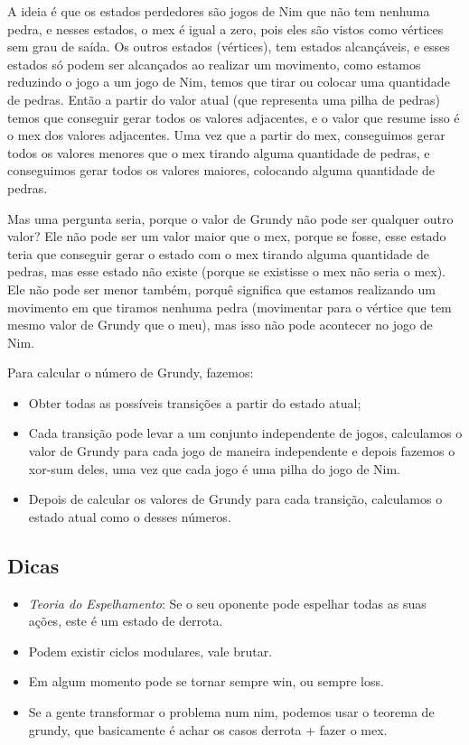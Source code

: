         A ideia é que os estados perdedores são jogos de Nim que não tem nenhuma pedra, e nesses estados, o mex é igual a zero, pois eles são vistos como vértices sem grau de saída. Os outros estados (vértices), tem estados alcançáveis, e esses estados só podem ser alcançados ao realizar um movimento, como estamos reduzindo o jogo a um jogo de Nim, temos que tirar ou colocar uma quantidade de pedras. Então a partir do valor atual (que representa uma pilha de pedras) temos que conseguir gerar todos os valores adjacentes, e o valor que resume isso é o mex dos valores adjacentes. Uma vez que a partir do mex, conseguimos gerar todos os valores menores que o mex tirando alguma quantidade de pedras, e conseguimos gerar todos os valores maiores, colocando alguma quantidade de pedras. 
        
        Mas uma pergunta seria, porque o valor de Grundy não pode ser qualquer outro valor? Ele não pode ser um valor maior que o mex, porque se fosse, esse estado teria que conseguir gerar o estado com o mex tirando alguma quantidade de pedras, mas esse estado não existe (porque se existisse o mex não seria o mex). Ele não pode ser menor também, porquê significa que estamos realizando um movimento em que tiramos nenhuma pedra (movimentar para o vértice que tem mesmo valor de Grundy que o meu), mas isso não pode acontecer no jogo de Nim.

        Para calcular o número de Grundy, fazemos:
        \begin{itemize}
            \item Obter todas as possíveis transições a partir do estado atual;
            \item Cada transição pode levar a um conjunto independente de jogos, calculamos o valor de Grundy para cada jogo de maneira independente e depois fazemos o xor-sum deles, uma vez que cada jogo é uma pilha do jogo de Nim.
            \item Depois de calcular os valores de Grundy para cada transição, calculamos o estado atual como o  desses números.
        \end{itemize}

        \subsection{Dicas}
        \begin{itemize}
            \item \textit{Teoria do Espelhamento}: Se o seu oponente pode espelhar todas as suas ações, este é um estado de derrota.
            \item Podem existir ciclos modulares, vale brutar.
            \item Em algum momento pode se tornar sempre win, ou sempre loss.
            \item Se a gente transformar o problema num nim, podemos usar o teorema de grundy, que basicamente é achar os casos derrota + fazer o mex.
        \end{itemize}
        
